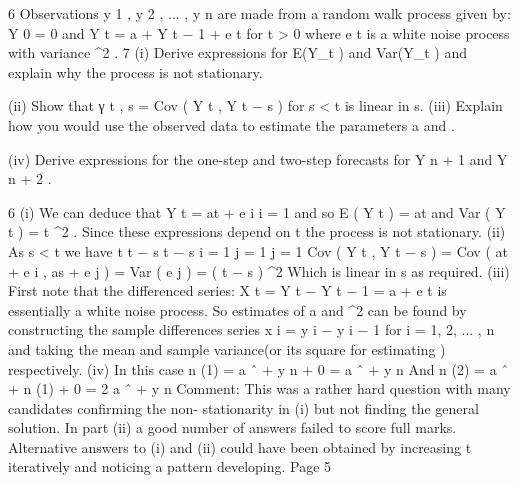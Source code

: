 \documentclass[a4paper,12pt]{article}
\begin{document}
 


6
Observations y 1 , y 2 , ... , y n are made from a random walk process given by:
Y 0 = 0 and Y t = a + Y t − 1 + e t for t > 0
where e t is a white noise process with variance \sigma^2 .
7
(i) Derive expressions for E(Y_{t} ) and Var(Y_{t} ) and explain why the process is not
stationary.

(ii) Show that γ t , s = Cov ( Y t , Y t − s ) for s < t is linear in s.
(iii) Explain how you would use the observed data to estimate the parameters a
and \sigma.

(iv) Derive expressions for the one-step and two-step forecasts for Y n + 1 and Y n + 2 .

6
(i)
We can deduce that Y t = at + \sum e i
i = 1
and so E ( Y t ) = at and
Var ( Y t ) = t \sigma^2 .
Since these expressions depend on t the process is not stationary.
(ii)
As s < t we have
t t − s t − s
i = 1 j = 1 j = 1
Cov ( Y t , Y t − s ) = Cov ( at + \sum e i , as + \sum e j ) = Var ( \sum e j ) = ( t − s ) \sigma^2
Which is linear in s as required.
(iii)
First note that the differenced series:
X t = Y t − Y t − 1 = a + e t
is essentially a white noise process. So estimates of a and \sigma^2 can be found by constructing the sample differences series x i = y i − y i − 1 for i = 1, 2, ... , n and
taking the mean and sample variance(or its square for estimating )
respectively.
(iv)
In this case  n (1) = a ˆ + y n + 0 = a ˆ + y n
And  n (2) = a ˆ +  n (1) + 0 = 2 a ˆ + y n
Comment: This was a rather hard question with many candidates confirming the non-
stationarity in (i) but not finding the general solution. In part (ii) a good number of answers
failed to score full marks. Alternative answers to (i) and (ii) could have been obtained by
increasing t iteratively and noticing a pattern developing.
Page 5%
\end{document}
